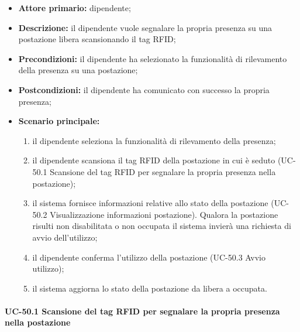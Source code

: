     \begin{itemize}
        \item \textbf{Attore primario:} dipendente;

        \item \textbf{Descrizione:} il dipendente vuole segnalare la propria presenza su una postazione libera scansionando il tag RFID;

        \item \textbf{Precondizioni:} il dipendente ha selezionato la funzionalità di rilevamento della presenza su una postazione;

        \item \textbf{Postcondizioni:} il dipendente ha comunicato con successo la propria presenza;

        \item \textbf{Scenario principale:}
            \begin{enumerate}
                \item il dipendente seleziona la funzionalità di rilevamento della presenza;
                \item il dipendente scansiona il tag RFID della postazione in cui è seduto (UC-50.1 Scansione del tag RFID per segnalare la propria presenza nella postazione);
                \item il sistema fornisce informazioni relative allo stato della postazione (UC-50.2 Visualizzazione informazioni postazione). Qualora la postazione risulti non disabilitata o non occupata il sistema invierà una richiesta di avvio dell'utilizzo;
                \item il dipendente conferma l'utilizzo della postazione (UC-50.3 Avvio utilizzo);
                \item il sistema aggiorna lo stato della postazione da libera a occupata.
            \end{enumerate}
    \end{itemize} 


\paragraph{UC-50.1 Scansione del tag RFID per segnalare la propria presenza nella postazione}
   
